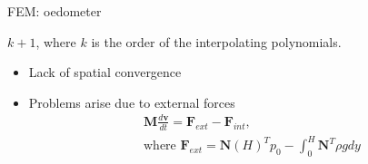 \documentclass[mathserif,professionalfont,hyperref={pdfpagelabels=false}]{beamer}
\begin{document}
% 
% 
\begin{frame}{FEM: oedometer}
	\begin{tcolorbox}[colback=red!5,colframe=red!50!black,title=Theoretical order of accuracy]
	$k+1$, where $k$ is the order of the interpolating polynomials\footnotemark.
	\end{tcolorbox}
	\pause
	\begin{tcolorbox}[colback=blue!5,colframe=blue!40!black,title=Observations]
	\begin{itemize}
	 \item Lack of spatial convergence
	 \item Problems arise due to external forces\\
	 \begin{align}\nonumber
	 & \mathbf{M}\frac{d \mathbf{v}}{dt} = \mathbf{F}_{ext}-\mathbf{F}_{int},\\ \nonumber
	 & \mbox{where } \mathbf{F}_{ext} = \mathbf{N}(H)^Tp_0 - \int_0^H \mathbf{N}^T\rho g dy
	 \end{align}
	\end{itemize}

	\end{tcolorbox}
\end{frame}
\end{document}
